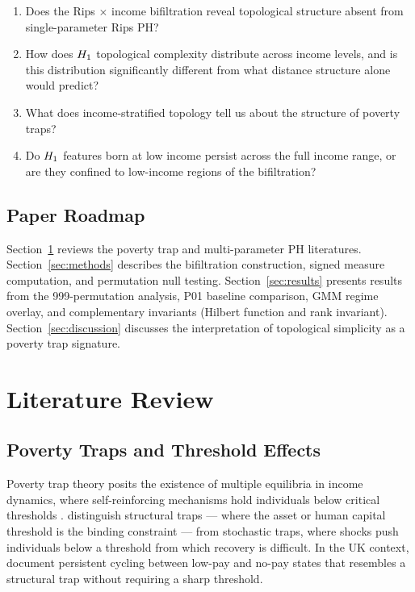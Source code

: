 \begin{enumerate}[label=(\arabic*)]
  \item Does the Rips $\times$ income bifiltration reveal topological
    structure absent from single-parameter Rips PH?
  \item How does $H_{1}$ topological complexity distribute across income
    levels, and is this distribution significantly different from what
    distance structure alone would predict?
  \item What does income-stratified topology tell us about the structure of
    poverty traps?
  \item Do $H_{1}$ features born at low income persist across the full
    income range, or are they confined to low-income regions of the
    bifiltration?
\end{enumerate}

\subsection{Paper Roadmap}

Section~\ref{sec:lit} reviews the poverty trap and multi-parameter PH
literatures. Section~\ref{sec:methods} describes the bifiltration
construction, signed measure computation, and permutation null testing.
Section~\ref{sec:results} presents results from the 999-permutation
analysis, P01 baseline comparison, GMM regime overlay, and complementary
invariants (Hilbert function and rank invariant).
Section~\ref{sec:discussion} discusses the interpretation of topological
simplicity as a poverty trap signature.

\section{Literature Review}
\label{sec:lit}

\subsection{Poverty Traps and Threshold Effects}

Poverty trap theory posits the existence of multiple equilibria in income
dynamics, where self-reinforcing mechanisms hold individuals below critical
thresholds \citep{azariadis2005poverty}. \citet{barrett2013economics}
distinguish structural traps --- where the asset or human capital threshold
is the binding constraint --- from stochastic traps, where shocks push
individuals below a threshold from which recovery is difficult. In the UK
context, \citet{shildrick2012poverty} document persistent cycling between
low-pay and no-pay states that resembles a structural trap without requiring
a sharp threshold.

